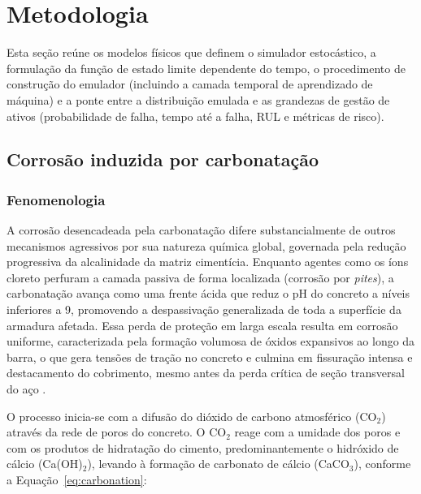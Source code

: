 \section{Metodologia}\label{sec:metodologia}

Esta seção reúne os modelos físicos que definem o simulador estocástico, a formulação da função de estado limite dependente do tempo, o procedimento de construção do emulador (incluindo a camada temporal de aprendizado de máquina) e a ponte entre a distribuição emulada e as grandezas de gestão de ativos (probabilidade de falha, tempo até a falha, RUL e métricas de risco).

\subsection{Corros\~ao induzida por carbonata\c{c}\~ao}
\label{subsec:carbonatacao}

\subsubsection{Fenomenologia}
\label{subsub:fenomenologia}

A corrosão desencadeada pela carbonatação difere substancialmente de outros mecanismos agressivos por sua natureza química global, governada pela redução progressiva da alcalinidade da matriz cimentícia. Enquanto agentes como os íons cloreto perfuram a camada passiva de forma localizada (corrosão por \textit{pites}), a carbonatação avança como uma frente ácida que reduz o pH do concreto a níveis inferiores a 9, promovendo a despassivação generalizada de toda a superfície da armadura afetada. Essa perda de proteção em larga escala resulta em corrosão uniforme, caracterizada pela formação volumosa de óxidos expansivos ao longo da barra, o que gera tensões de tração no concreto e culmina em fissuração intensa e destacamento do cobrimento, mesmo antes da perda crítica de seção transversal do aço \parencite{tuutti1982}.

O processo inicia-se com a difusão do dióxido de carbono atmosférico (CO$_2$) através da rede de poros do concreto. O CO$_2$ reage com a umidade dos poros e com os produtos de hidratação do cimento, predominantemente o hidróxido de cálcio (Ca(OH)$_2$), levando à formação de carbonato de cálcio (CaCO$_3$), conforme a Equação~\eqref{eq:carbonation}:

